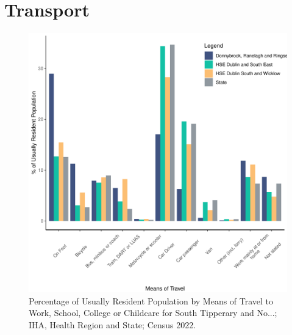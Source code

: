 \documentclass{article}
\begin{document}
\section{Transport}\label{sect:Trans}
\begin{figure}[H]
	\centering
	\includegraphics[width = 120mm]{../figures/TravelED.pdf}
	\caption{Percentage of Usually Resident Population by Means of Travel to Work, School, College or Childcare for South Tipperary and No...; IHA, Health Region and State; Census 2022.}
	\label{fig:vbnv}
	\end{figure}
\end{document}
